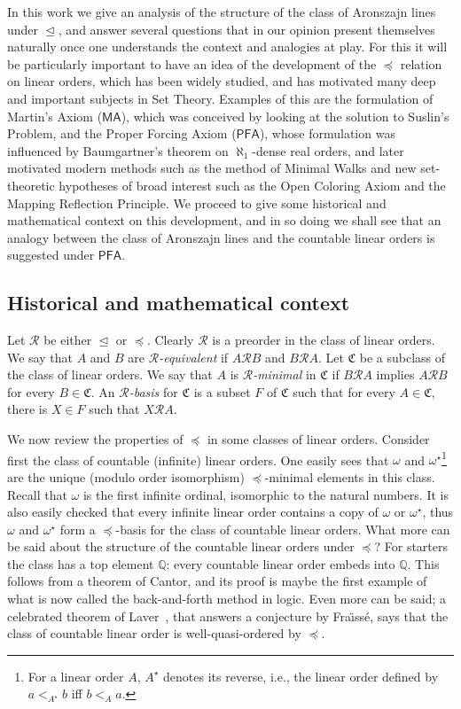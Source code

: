 \documentclass[10pt]{amsart}
\theoremstyle{definition}
\theoremstyle{remark}
\newcommand{\axiom}[1]{\mathsf{#1}}
\newcommand{\MA}{\axiom{MA}}
\newcommand{\PFA}{\axiom{PFA}}
\newcommand{\eleq}{\preceq}
\newcommand{\sleq}{\trianglelefteq}
\newcommand{\1}{\mathbbm{1}}
\begin{document}
In this work we give an analysis of the structure of the class of
Aronszajn lines under $\sleq$, and answer several questions that in
our opinion present themselves naturally once one understands the context and analogies at play. For this it will be particularly important to
have an idea of the development of the $\eleq$ relation on
linear orders, which has been widely studied, and has motivated many deep
and important subjects in Set Theory.  Examples of this are the
formulation of Martin's Axiom ($\MA$), which was conceived by looking
at the solution to Suslin's Problem, and the Proper Forcing Axiom
($\PFA$), whose formulation was influenced by Baumgartner's theorem on
$\aleph_{1}$-dense real orders, and later motivated modern methods
such as the method of Minimal Walks and new set-theoretic hypotheses
of broad interest such as the Open Coloring Axiom and the Mapping Reflection
Principle. We proceed to give
some historical and mathematical context on this development, and in
so doing we shall see that an analogy between the class
of Aronszajn lines and the countable linear orders is suggested under
$\PFA$.


\subsection*{Historical and mathematical context}


Let $\mathcal{R}$ be either $\sleq$ or $\eleq$. Clearly $\mathcal{R}$
is a preorder in the class of linear orders. We say that $A$ and $B$
are \emph{$\mathcal{R}$-equivalent} if $A \mathrel{\mathcal{R}} B$ and
$B \mathrel{\mathcal{R}} A$.  Let $\mathfrak{C}$ be a subclass of the
class of linear orders. We say that $A$ is \emph{$\mathcal{R}$-minimal} in
$\mathfrak{C}$ if $B \mathrel{\mathcal{R}} A$ implies $A
\mathrel{\mathcal{R}} B$ for every $B \in \mathfrak{C}$.  An
\emph{$\mathcal{R}$-basis} for $\mathfrak{C}$ is a subset $F$ of
$\mathfrak{C}$ such that for every $A \in \mathfrak{C}$, there is $X \in
F$ such that $X \mathrel{\mathcal{R}} A$.


We now review the properties of $\eleq$ in some classes of linear orders.
Consider first the class of countable (infinite) linear orders. One
easily sees that $\omega$ and $\omega^{\star}$\footnote{For a linear order $A$,
  $A^{\star}$ denotes its reverse, i.e., the linear order
  defined by $a <_{A^{\star}} b$ iff $b <_{A} a$.}
are the unique (modulo order isomorphism)
$\eleq$-minimal
elements in this class. Recall that $\omega$ is the first infinite ordinal,
isomorphic to the
natural numbers.
It is also easily checked that every infinite linear order contains a
copy of $\omega$ or $\omega^{\star}$, thus $\omega$ and $\omega^{\star}$ form a
$\eleq$-basis for the class of countable linear orders. What more can
be said about the structure of the countable linear orders under $\eleq$? For
starters the class has a top element $\mathbb{Q}$: every countable
linear order embeds into $\mathbb{Q}$. This follows from a theorem of
Cantor, and its proof is maybe the first example of what is now called the
back-and-forth method in logic. Even more can be said; a celebrated
theorem of Laver~\cite{Laver1970}, that answers a conjecture by Fra\"{\i}ssé,
says that the class of countable linear order is well-quasi-ordered by
$\eleq$.
\end{document}
